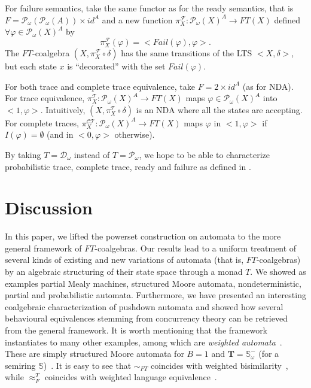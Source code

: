 \documentclass{LMCS}
\def\pow#1{{\mathcal P_\omega}#1}
\def\T{\mathbf{T}}
\begin{document}
For failure semantics, take the same functor as for the ready semantics, that is $F=\pow(\pow(A)) \times id^A$ 
and a new function $\pi^\mathcal{F}_X \colon \pow(X)^A \to FT(X)$
defined $\forall \varphi \in \pow(X)^A$ by $$\pi^\mathcal{F}_X (\varphi)= <\textit{Fail}(\varphi),
\varphi>\text{.}$$
The $FT$-coalgebra $(X,\pi^\mathcal{F}_X \circ \delta)$ has the same
transitions of the LTS $<X,\delta>$, but each state $x$ is ``decorated''
with the set $\textit{Fail}(\varphi)$.



For both trace and complete trace equivalence, take $F=2 \times
id^A$ (as for NDA). For trace equivalence,
$\pi^\mathcal{T}_X \colon \pow(X)^A \to FT(X)$ maps $\varphi \in \pow(X)^A$
into $<1, \varphi>$. Intuitively, $(X,\pi^\mathcal{T}_X \circ \delta)$ is
an NDA where all the states are accepting.
For complete traces, $\pi^{\mathcal{CT}}_X\colon \pow(X)^A \to FT(X)$ maps
$\varphi$ in $<1,\varphi>$ if $I(\varphi)=\emptyset$ (and in
$<0,\varphi>$ otherwise).

By taking $T=\mathcal D_\omega$ instead of $T=\mathcal P_\omega$, we hope to be able to 
 characterize probabilistic trace, complete trace, ready and
failure as defined in \cite{JouS90}. 
















\section{Discussion}\label{sec:discussion}
In this paper, we lifted the powerset construction on automata to the
more general framework of $FT$-coalgebras.
Our results lead to a uniform treatment of several kinds of
existing and new variations of automata (that is,
$FT$-coalgebras) by an algebraic structuring of their state space through a monad $T$.
 We showed as examples partial Mealy
machines, structured Moore automata, nondeterministic, partial and
 probabilistic automata. Furthermore, we have presented an interesting coalgebraic characterization of pushdown automata and showed how several behavioural equivalences stemming from 
 concurrency theory can be retrieved from the general framework. It is worth
mentioning that the framework instantiates to many other examples,
among which are \emph{weighted automata}~\cite{Schutzenberger61b}. These
are simply structured Moore automata for $B=1$ and
$\T=\mathbb{S}_{\omega}^-$ (for a semiring
$\mathbb{S}$)~\cite{gumm}.
It is easy to see that $\sim_{FT}$ coincides with weighted
bisimilarity~\cite{german}, while $\approx^T_F$ coincides with
weighted language equivalence~\cite{Schutzenberger61b}.
\end{document}
